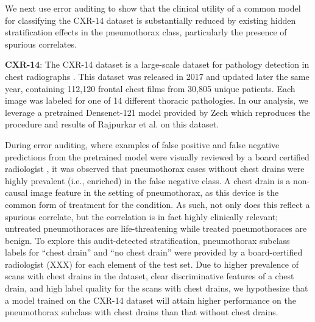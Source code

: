 \documentclass{article}
\begin{document}
We next use error auditing to show that the clinical utility of a common model for classifying the CXR-14 dataset is substantially reduced by existing hidden stratification effects in the pneumothorax class, particularly the presence of spurious correlates.

\textbf{CXR-14}: The CXR-14 dataset is a large-scale dataset for pathology detection in chest radiographs \citep{Wang2017-vm}. 
This dataset was released in 2017 and updated later the same year, containing 112,120 frontal chest films from 30,805 unique patients. 
Each image was labeled for one of 14 different thoracic pathologies.  
In our analysis, we leverage a pretrained Densenet-121 model provided by Zech \citep{Zech_undated-cw} which reproduces the procedure and results of Rajpurkar et al. \citep{Rajpurkar2018-gc} on this dataset.  

During error auditing, where examples of false positive and false negative predictions from the pretrained model were visually reviewed by a board certified radiologist \citep{Oakden-Rayner2019-yi},
it was observed that pneumothorax cases without chest drains were highly prevalent (i.e., enriched) in the false negative class.
A chest drain is a non-causal image feature in the setting of pneumothorax, as this device is the common form of treatment for the condition. 
As such, not only does this reflect a spurious correlate, but the correlation is in fact highly clinically relevant; untreated pneumothoraces are life-threatening while treated pneumothoraces are benign.
 To explore this audit-detected stratification, pneumothorax subclass labels for ``chest drain'' and ``no chest drain'' were provided by a board-certified radiologist (XXX) for each element of the test set.  
 Due to higher prevalence of scans with chest drains in the dataset, clear discriminative features of a chest drain, and high label quality for the scans with chest drains, we hypothesize that a model trained on the CXR-14 dataset will attain higher performance on the pneumothorax subclass with chest drains than that without chest drains.  
 
\end{document}
